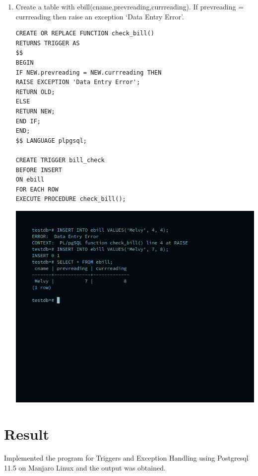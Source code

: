 \begin{enumerate}
\item Create a table with ebill(cname,prevreading,currreading). If prevreading = currreading then raise an exception ‘Data Entry Error’.
\begin{verbatim}
CREATE OR REPLACE FUNCTION check_bill()
RETURNS TRIGGER AS
$$
BEGIN
IF NEW.prevreading = NEW.currreading THEN
RAISE EXCEPTION 'Data Entry Error';
RETURN OLD;
ELSE
RETURN NEW;
END IF;
END;
$$ LANGUAGE plpgsql;

CREATE TRIGGER bill_check
BEFORE INSERT
ON ebill
FOR EACH ROW
EXECUTE PROCEDURE check_bill();

\end{verbatim}


\newline
\includegraphics[width=\linewidth]{../Images/Triggers/7.png}
\end{enumerate}

\section{Result}
Implemented the program for Triggers and Exception Handling using Postgresql 11.5 on Manjaro Linux and the output was obtained.
